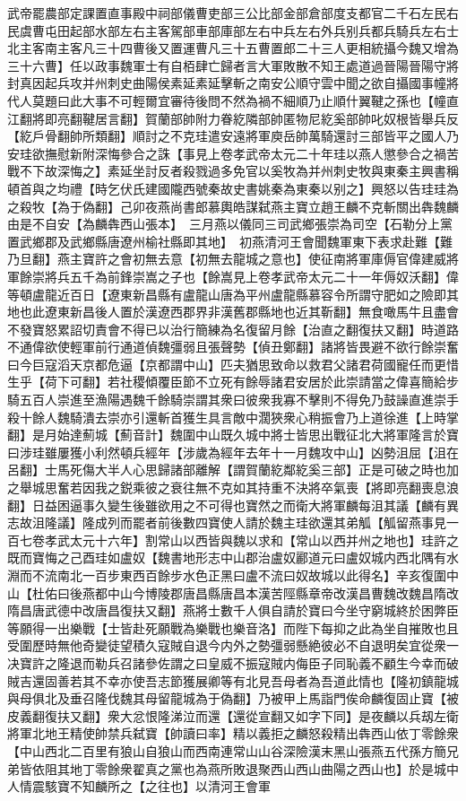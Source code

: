 武帝罷農部定課置直事殿中祠部儀曹吏部三公比部金部倉部度支都官二千石左民右民虞曹屯田起部水部左右主客駕部車部庫部左右中兵左右外兵别兵都兵騎兵左右士北主客南主客凡三十四曹後又置運曹凡三十五曹置郎二十三人更相統攝今魏又增為三十六曹】任以政事魏軍士有自栢肆亡歸者言大軍敗散不知王處道過晉陽晉陽守將封真因起兵攻并州刺史曲陽侯素延素延擊斬之南安公順守雲中聞之欲自攝國事幢將代人莫題曰此大事不可輕爾宜審待後問不然為禍不細順乃止順什翼鞬之孫也【幢直江翻將即亮翻鞬居言翻】賀蘭部帥附力眷紇隣部帥匿物尼紇奚部帥叱奴根皆舉兵反【紇戶骨翻帥所類翻】順討之不克珪遣安遠將軍庾岳帥萬騎還討三部皆平之國人乃安珪欲撫慰新附深悔參合之誅【事見上卷孝武帝太元二十年珪以燕人懲參合之禍苦戰不下故深悔之】素延坐討反者殺戮過多免官以奚牧為并州刺史牧與東秦主興書稱頓首與之均禮【時乞伏氏建國隴西號秦故史書姚秦為東秦以别之】興怒以告珪珪為之殺牧【為于偽翻】己卯夜燕尚書郎慕輿皓謀弑燕主寶立趙王麟不克斬關出犇魏麟由是不自安【為麟犇西山張本】　三月燕以儀同三司武鄉張崇為司空【石勒分上黨置武鄉郡及武鄉縣唐遼州榆社縣即其地】　初燕清河王會聞魏軍東下表求赴難【難乃旦翻】燕主寶許之會初無去意【初無去龍城之意也】使征南將軍庫傉官偉建威將軍餘崇將兵五千為前鋒崇嵩之子也【餘嵩見上卷孝武帝太元二十一年傉奴沃翻】偉等頓盧龍近百日【遼東新昌縣有盧龍山唐為平州盧龍縣慕容令所謂守肥如之險即其地也此遼東新昌後人置於漢遼西郡界非漢舊郡縣地也近其靳翻】無食噉馬牛且盡會不發寶怒累詔切責會不得已以治行簡練為名復留月餘【治直之翻復扶又翻】時道路不通偉欲使輕軍前行通道偵魏彊弱且張聲勢【偵丑鄭翻】諸將皆畏避不欲行餘崇奮曰今巨寇滔天京都危逼【京都謂中山】匹夫猶思致命以救君父諸君荷國寵任而更惜生乎【荷下可翻】若社稷傾覆臣節不立死有餘辱諸君安居於此崇請當之偉喜簡給步騎五百人崇進至漁陽遇魏千餘騎崇謂其衆曰彼衆我寡不擊則不得免乃鼓譟直進崇手殺十餘人魏騎潰去崇亦引還斬首獲生具言敵中濶狹衆心稍振會乃上道徐進【上時掌翻】是月始達薊城【薊音計】魏圍中山既久城中將士皆思出戰征北大將軍隆言於寶曰涉珪雖屢獲小利然頓兵經年【涉歲為經年去年十一月魏攻中山】凶勢沮屈【沮在呂翻】士馬死傷大半人心思歸諸部離解【謂賀蘭紇鄰紇奚三部】正是可破之時也加之舉城思奮若因我之鋭乘彼之衰往無不克如其持重不決將卒氣喪【將即亮翻喪息浪翻】日益困逼事久變生後雖欲用之不可得也寶然之而衛大將軍麟每沮其議【麟有異志故沮隆議】隆成列而罷者前後數四寶使人請於魏主珪欲還其弟觚【觚留燕事見一百七卷孝武太元十六年】割常山以西皆與魏以求和【常山以西并州之地也】珪許之既而寶悔之己酉珪如盧奴【魏書地形志中山郡治盧奴酈道元曰盧奴城内西北隅有水淵而不流南北一百步東西百餘步水色正黑曰盧不流曰奴故城以此得名】辛亥復圍中山【杜佑曰後燕都中山今博陵郡唐昌縣唐昌本漢苦陘縣章帝改漢昌曹魏改魏昌隋改隋昌唐武德中改唐昌復扶又翻】燕將士數千人俱自請於寶曰今坐守窮城終於困弊臣等願得一出樂戰【士皆赴死願戰為樂戰也樂音洛】而陛下每抑之此為坐自摧敗也且受圍歷時無他奇變徒望積久寇賊自退今内外之勢彊弱懸絶彼必不自退明矣宜從衆一决寶許之隆退而勒兵召諸參佐謂之曰皇威不振寇賊内侮臣子同恥義不顧生今幸而破賊吉還固善若其不幸亦使吾志節獲展卿等有北見吾母者為吾道此情也【隆初鎮龍城與母俱北及垂召隆伐魏其母留龍城為于偽翻】乃被甲上馬詣門俟命麟復固止寶【被皮義翻復扶又翻】衆大忿恨隆涕泣而還【還從宣翻又如字下同】是夜麟以兵刼左衛將軍北地王精使帥禁兵弑寶【帥讀曰率】精以義拒之麟怒殺精出犇西山依丁零餘衆【中山西北二百里有狼山自狼山而西南連常山山谷深險漢末黑山張燕五代孫方簡兄弟皆依阻其地丁零餘衆翟真之黨也為燕所敗退聚西山西山曲陽之西山也】於是城中人情震駭寶不知麟所之【之往也】以清河王會軍